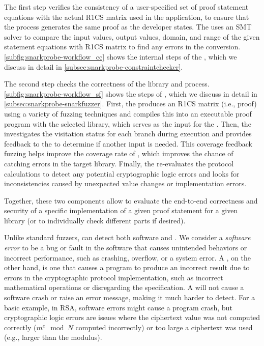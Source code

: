 The first step verifies the consistency of a user-specified set of proof statement equations with the actual R1CS matrix used in the application, to ensure that the \circuitgen process generates the same proof as the developer states. The \ConstraintChecker uses an SMT solver to compare the input values, output values, domain, and range of the given statement equations with R1CS matrix to find any errors in the conversion. \autoref{subfig:snarkprobe-workflow_cc} shows the internal steps of the \ConstraintChecker, which we discuss in detail in \autoref{subsec:snarkprobe-constraintchecker}.


The second step checks the correctness of the library and \proofgen process. \autoref{subfig:snarkprobe-workflow_sf} shows the steps of \SnarkFuzzer, which we discuss in detail in \autoref{subsec:snarkprobe-snarkfuzzer}.
First, the  produces an R1CS matrix (i.e., proof) using a variety of fuzzing techniques and compiles this into an executable proof program with the selected library, which serves as the input for the \branchmodel. Then, the \branchmodel investigates the visitation status for each branch during execution and provides feedback to the  to determine if another input is needed. This coverage feedback fuzzing helps improve the coverage rate of \SnarkFuzzer, which improves the chance of catching errors in the target library. Finally, the  re-evaluates the protocol calculations to detect any potential cryptographic logic errors and looks for inconsistencies caused by unexpected value changes or implementation errors.

Together, these two components allow \snarkprobe to evaluate the end-to-end correctness and security of a specific implementation of a given proof statement for a given library (or to individually check different parts if desired).

Unlike standard fuzzers, \SnarkFuzzer can detect both software and .  We consider a \emph{software error} to be a bug or fault in the software that causes unintended behaviors or incorrect performance, such as crashing, overflow, or a system error.  A \emph{\logicerror}, on the other hand, is one that causes a program to produce an incorrect result due to errors in the cryptographic protocol implementation, such as incorrect mathematical operations or disregarding the specification. A \logicerror will not cause a software crash or raise an error message, making it much harder to detect.
For a basic example, in RSA, software errors might cause a program crash, but cryptographic logic errors are issues where the ciphertext value was not computed correctly ($m^e \mod N$ computed incorrectly) or too large a ciphertext was used (e.g., larger than the modulus).


